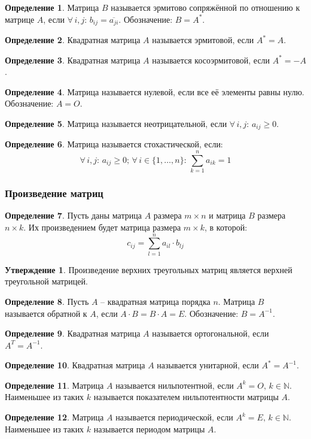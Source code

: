 \documentclass[12pt]{article}
\theoremstyle{definition}
\newtheorem{definition}{Определение}
\newtheorem{statement}[theorem]{Утверждение}
\newcommand{\N}{\mathbb{N}}
\begin{document}
\begin{definition}
    Матрица $B$ называется эрмитово сопряжённой по отношению к матрице $A$, если $\forall\,i,j:\,b_{ij}=\overline{a_{ji}}$. Обозначение: $B=A^*$.
\end{definition}
\begin{definition}
    Квадратная матрица $A$ называется эрмитовой, если $A^*=A$.
\end{definition}
\begin{definition}
    Квадратная матрица $A$ называется косоэрмитовой, если $A^*=-A$.
\end{definition}
\begin{definition}
    Матрица называется нулевой, если все её элементы равны нулю. Обозначение: $A=O$.
\end{definition}
\begin{definition}
    Матрица называется неотрицательной, если $\forall\,i,j:\,a_{ij}\geq0$.
\end{definition}
\begin{definition}
    Матрица называется стохастической, если:
    $$\forall\,i,j:\,a_{ij}\geq0;\,\forall\,i\in\{1,\ldots,n\}:\,\sum_{k=1}^{n}a_{ik}=1$$
\end{definition}

\subsubsection{Произведение матриц}

\begin{definition}
    Пусть даны матрица $A$ размера $m\times n$ и матрица $B$ размера $n\times k$. Их произведением будет матрица размера $m\times k$, в которой:
    $$c_{ij}=\sum_{l=1}^{n}a_{il}\cdot b_{lj}$$
\end{definition}
\begin{statement}
    Произведение верхних треугольных матриц является верхней треугольной матрицей.
\end{statement}
\begin{definition}
    Пусть $A$ – квадратная матрица порядка $n$. Матрица $B$ называется обратной к $A$, если $A\cdot B=B\cdot A=E$. Обозначение: $B=A^{-1}$.
\end{definition}
\begin{definition}
    Квадратная матрица $A$ называется ортогональной, если $A^T=A^{-1}$.
\end{definition}
\begin{definition}
    Квадратная матрица $A$ называется унитарной, если $A^*=A^{-1}$.
\end{definition}
\begin{definition}
    Матрица $A$ называется нильпотентной, если $A^k=O,\,k\in \N$. Наименьшее из таких $k$ называется показателем нильпотентности матрицы $A$.
\end{definition}
\begin{definition}
    Матрица $A$ называется периодической, если $A^k=E,\,k\in \N$. Наименьшее из таких $k$ называется периодом матрицы $A$.
\end{definition}
\end{document}
